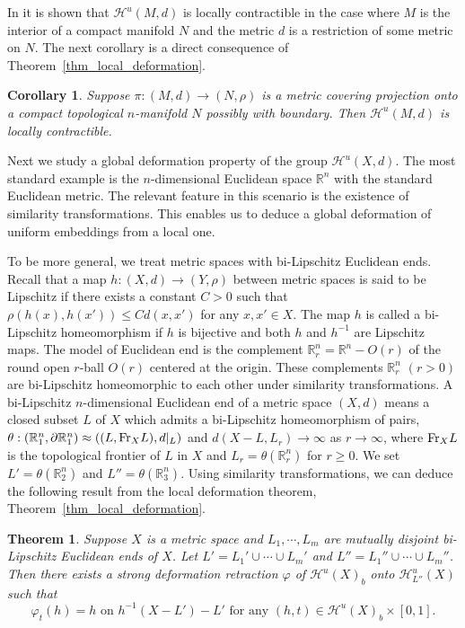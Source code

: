 \documentclass[11pt, fleqn]{amsart}
\newtheorem{theorem}{Theorem}[section]
\newtheorem{corollary}{Corollary}[section]
\theoremstyle{definition}
\newcommand{\cal}{\mathcal}
\renewcommand{\phi}{\varphi}
\newcommand{\IR}{\mathbb R}
\begin{document}
In \cite{Ce} it is shown that ${\cal H}^u(M, d)$ is locally contractible in the case where  
$M$ is the interior of a compact manifold $N$ and the metric $d$ is a restriction of some metric on $N$.  
The next corollary is a direct consequence of Theorem~\ref{thm_local_deformation}. 

\begin{corollary}\label{cor_local_contractibility} 
Suppose $\pi : (M, d) \to (N, \rho)$ is a metric covering projection onto a compact topological $n$-manifold $N$ possibly with boundary.
Then ${\cal H}^u(M, d)$ is locally contractible.  
\end{corollary}

Next we study a global deformation property of the group ${\cal H}^u(X,d)$. 
The most standard example is the $n$-dimensional Euclidean space $\IR^n$ with the standard Euclidean metric. 
The relevant feature in this scenario is the existence of similarity transformations. 
This enables us to deduce a global deformation of uniform embeddings from a local one. 

To be more general, 
we treat metric spaces with bi-Lipschitz Euclidean ends. 
Recall that a map $h : (X,d) \to (Y, \rho)$ between metric spaces is said to be Lipschitz if there exists a constant $C > 0$ 
such that $\rho(h(x), h(x')) \leq Cd(x, x')$ for any $x, x' \in X$. 
The map $h$ is called a bi-Lipschitz homeomorphism if $h$ is bijective and both $h$ and $h^{-1}$ are Lipschitz maps. 
The model of Euclidean end is the complement $\IR^n_r = \IR^n - O(r)$ of the round open $r$-ball $O(r)$ centered at the origin. 
These complements $\IR^n_r$ $(r > 0)$ are bi-Lipschitz homeomorphic to each other under  similarity transformations. 
A bi-Lipschitz $n$-dimensional Euclidean end of a metric space $(X, d)$ means a closed subset $L$ of $X$ 
which admits a bi-Lipschitz homeomorphism of pairs, 
$\theta : (\IR^n_1, \partial \IR^n_1) \approx ((L, {\rm Fr}_X L), d|_L)$ and $d(X - L, L_r) \to \infty$ as $r \to \infty$, where 
${\rm Fr}_X L$ is the topological frontier of $L$ in $X$ and 
$L_r = \theta(\IR^n_r)$ for $r \geq 0$. 
We set $L' = \theta(\IR^n_2)$ and $L'' = \theta(\IR^n_3)$. 
Using similarity transformations, we can deduce the following result from the local deformation theorem, Theorem~\ref{thm_local_deformation}. 

\begin{theorem}\label{thm_Euclid-end}
Suppose $X$ is a metric space and $L_1, \cdots, L_m$ are mutually disjoint bi-Lipschitz Euclidean ends of $X$. 
Let $L' = L_1' \cup \cdots \cup L_m'$ and $L'' = L_1'' \cup \cdots \cup L_m''$. 
Then there exists a strong deformation retraction $\phi$ of ${\cal H}^u(X)_b$ onto ${\cal H}^u_{L''}(X)$ such that 
$$\mbox{$\phi_t(h) = h$ \ on \ $h^{-1}(X - L') - L'$ \ \ for any \ $(h,t ) \in {\cal H}^u(X)_b \times [0,1]$.}$$  
\end{theorem} 
\end{document}
